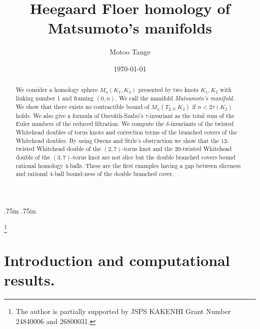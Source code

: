 \documentclass[11pt]{amsart}
\begin{document}
\textwidth 5.5in
\textheight 8.3in
\evensidemargin .75in
\oddsidemargin.75in

\newtheorem{lem}{Lemma}
\newtheorem{conj}{Conjecture}
\newtheorem{defi}{Definition}
\newtheorem{thm}{Theorem}
\newtheorem{cor}{Corollary}
\newtheorem{lis}{List}
\newtheorem{rmk}{Remark}
\newtheorem{que}{Question}
\newtheorem{prop}{Proposition}

\title{Heegaard Floer homology of Matsumoto's manifolds}
\author{Motoo Tange}
\thanks{The author is partially supported by JSPS KAKENHI Grant Number 24840006 and 26800031.}
\address{University of Tsukuba, 1-1-1 Tennodai, Tsukuba, Ibaraki 305-8571 Japan}
\date{\today}
\maketitle
\begin{abstract}
We consider a homology sphere $M_n(K_1,K_2)$ presented by two knots $K_1,K_2$ with linking number 1 and framing $(0,n)$.
We call the manifold {\it Matsumoto's manifold}.
We show that there exists no contractible bound of $M_n(T_{2,3},K_2)$ if $n<2\tau(K_2)$ holds.
We also give a formula of Ozsv\'ath-Szab\'o's $\tau$-invariant as the total sum of the Euler numbers of the reduced filtration. 
We compute the $\delta$-invariants of the twisted Whitehead doubles of torus knots and correction terms of the branched covers of the Whitehead doubles.
By using Owens and Strle's obstruction we show that the $12$-twisted Whitehead double of the $(2,7)$-torus knot and the $20$-twisted Whitehead double of the $(3,7)$-torus knot are not slice 
but the double branched covers bound rational homology 4-balls.
These are the first examples having a gap between sliceness and rational 4-ball bound-ness of the double branched cover.
\end{abstract}
\section{Introduction and computational results.}
\end{document}
